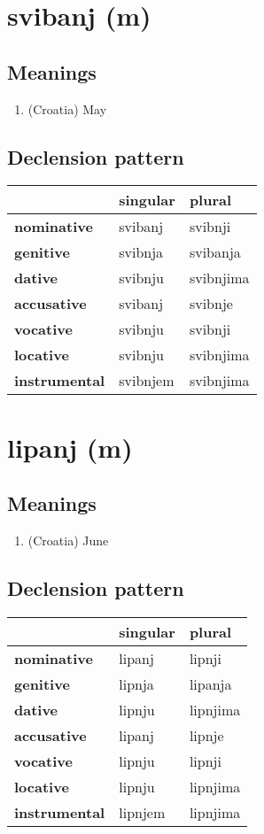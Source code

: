 \filbreak
\section{svibanj (m)}
\subsection*{Meanings}
\begin{enumerate}
\item (Croatia) May
\end{enumerate}
\subsection*{Declension pattern}
\begin{tabularx}{\linewidth}{Xll}
\toprule
{} &  singular &     plural \\
\midrule
\textbf{nominative  } &   svibanj &    svibnji \\
\textbf{genitive    } &   svibnja &   svibanja \\
\textbf{dative      } &   svibnju &  svibnjima \\
\textbf{accusative  } &   svibanj &    svibnje \\
\textbf{vocative    } &   svibnju &    svibnji \\
\textbf{locative    } &   svibnju &  svibnjima \\
\textbf{instrumental} &  svibnjem &  svibnjima \\
\bottomrule
\end{tabularx}

\filbreak
\section{lipanj (m)}
\subsection*{Meanings}
\begin{enumerate}
\item (Croatia) June
\end{enumerate}
\subsection*{Declension pattern}
\begin{tabularx}{\linewidth}{Xll}
\toprule
{} & singular &    plural \\
\midrule
\textbf{nominative  } &   lipanj &    lipnji \\
\textbf{genitive    } &   lipnja &   lipanja \\
\textbf{dative      } &   lipnju &  lipnjima \\
\textbf{accusative  } &   lipanj &    lipnje \\
\textbf{vocative    } &   lipnju &    lipnji \\
\textbf{locative    } &   lipnju &  lipnjima \\
\textbf{instrumental} &  lipnjem &  lipnjima \\
\bottomrule
\end{tabularx}

